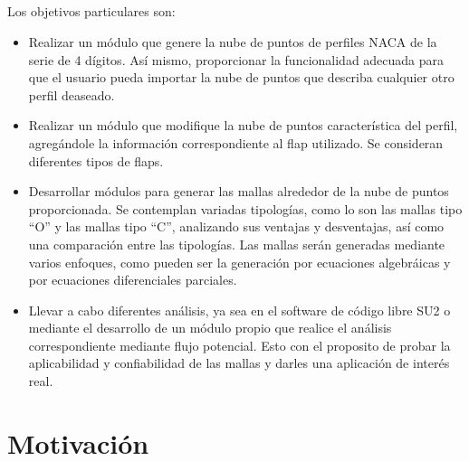 \documentclass[letterpaper, openright, 12pt]{book}
\begin{document}
    \paragraph*{}
    Los objetivos particulares son:
        \begin{itemize}
            \item{Realizar un módulo que genere la nube de puntos de perfiles
                NACA de la serie de 4 dígitos. Así mismo, proporcionar la
                funcionalidad adecuada para que el usuario pueda importar la
                nube de puntos que describa cualquier otro perfil deaseado.}
            \item{Realizar un módulo que modifique la nube de puntos
                característica del perfil, agregándole la información
                correspondiente al flap utilizado. Se consideran
                diferentes tipos de flaps.}
            \item{Desarrollar módulos para generar las mallas alrededor de la
                nube de puntos proporcionada. Se contemplan variadas tipologías,
                como lo son las mallas tipo “O” y las mallas tipo “C”,
                analizando sus ventajas y desventajas, así como una comparación
                entre las tipologías. Las mallas serán generadas mediante varios
                enfoques, como pueden ser la generación por ecuaciones
                algebráicas y por ecuaciones diferenciales parciales.}
            \item{Llevar a cabo diferentes análisis, ya sea en el software de
                código libre SU2 o mediante el desarrollo de un módulo propio
                que realice el análisis correspondiente mediante flujo 
                potencial. Esto con el proposito de probar la aplicabilidad y
                confiabilidad de las mallas y darles una aplicación de interés
                real.}
        \end{itemize}




    \chapter*{Motivación}
\end{document}

